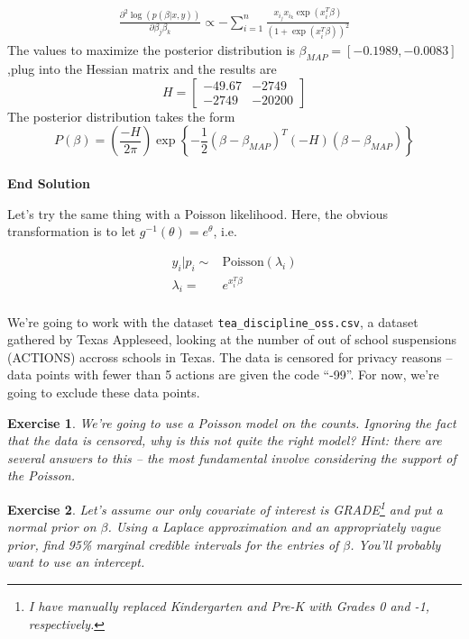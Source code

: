 \documentclass[twoside]{article}
\newcounter{lecnum}
\newtheorem{exercise}{Exercise}[lecnum]
\begin{document}
\begin{equation*}
\begin{split}
\frac{\partial^2 \log \left(p(\beta|x,y) \right)}{\partial \beta_j \beta_k} \propto -\sum_{i=1}^n\frac{x_{i_j}x_{i_k}\exp\left(x_i^T\beta\right)}{\left(1+\exp\left(x_i^T\beta\right)\right)^2}
\end{split}
\end{equation*}
The values to maximize the posterior distribution is $\beta_{MAP} = [-0.1989,-0.0083]$,plug into the Hessian matrix and the results are
$$
H = \begin{bmatrix}
    -49.67       & -2749 \\
    -2749       & -20200
\end{bmatrix}
$$
The posterior distribution takes the form
$$P(\beta) = \left(\frac{-H}{2\pi} \right)\exp \left\{-\frac{1}{2}\left(\beta - \beta_{MAP} \right)^T\left(-H \right) \left(\beta - \beta_{MAP} \right) \right\} $$\\
\textbf{End Solution}  

  Let's try the same thing with a Poisson likelihood. Here, the obvious transformation is to let $g^{-1}(\theta) = e^{\theta}$, i.e.

$$\begin{aligned}
  y_i|p_i \sim& \mbox{Poisson}(\lambda_i)\\
  \lambda_i =& e^{x_i^T\beta}\\
\end{aligned}$$

  We're going to work with the dataset \texttt{tea\_discipline\_oss.csv}, a dataset gathered by Texas Appleseed, looking at the number of out of school suspensions (ACTIONS) accross schools in Texas. The data is censored for privacy reasons -- data points with fewer than 5 actions are given the code ``-99''. For now, we're going to exclude these data points. 

  \begin{exercise}
    We're going to use a Poisson model on the counts. Ignoring the fact that the data is censored, why is this not quite the right model? \textit{Hint: there are several answers to this -- the most fundamental involve considering the support of the Poisson}.
  \end{exercise}

  
  \begin{exercise}
    Let's assume our only covariate of interest is GRADE\footnote{I have manually replaced Kindergarten and Pre-K with Grades 0 and -1, respectively.} and put a normal prior on $\beta$. Using a Laplace approximation and an appropriately vague prior, find  95\% marginal credible intervals for the entries of $\beta$. You'll probably want to use an intercept.
  \end{exercise}
\end{document}
